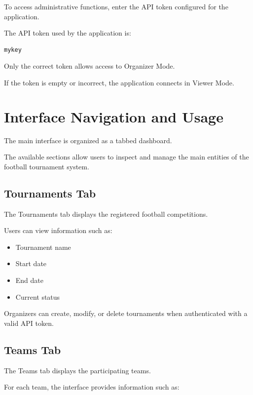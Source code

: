 \documentclass[12pt,a4paper]{article}
\begin{document}
To access administrative functions, enter the API token
configured for the application.

The API token used by the application is:

\begin{lstlisting}
mykey
\end{lstlisting}

Only the correct token allows access to Organizer Mode.

If the token is empty or incorrect, the application connects
in Viewer Mode.


\section{Interface Navigation and Usage}

The main interface is organized as a tabbed dashboard.

The available sections allow users to inspect and manage the
main entities of the football tournament system.

\subsection{Tournaments Tab}

The Tournaments tab displays the registered football
competitions.

Users can view information such as:

\begin{itemize}
\item Tournament name
\item Start date
\item End date
\item Current status
\end{itemize}

Organizers can create, modify, or delete tournaments when
authenticated with a valid API token.

\subsection{Teams Tab}

The Teams tab displays the participating teams.

For each team, the interface provides information such as:
\end{document}
